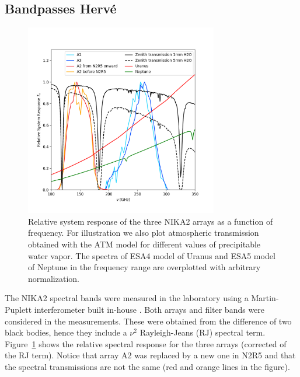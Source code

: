 


\subsection{Bandpasses {\color{YellowGreen} Herv\'e} }
\label{se:bandpasses}

\begin{figure}[ht!] %
\begin{center}
\includegraphics[clip,trim={0, 1cm, 0, 2cm},width=0.75\textwidth]{Figures/SpectralBands/bandpasses_nika2_colorsok.png}
\caption[NIKA2 transmission]{Relative system response of the three NIKA2 arrays as a
  function of frequency. For illustration we also plot atmospheric transmission obtained with the ATM model 
 \cite{ATM} for different values of precipitable water vapor. The spectra of ESA4 model of Uranus and ESA5 model of Neptune \cite{ESAmodel} in the frequency range are overplotted with arbitrary normalization.} 
 \label{spectralband1}
\end{center}
\end{figure}

 

The NIKA2 spectral bands were measured in the laboratory using a
Martin-Puplett interferometer built in-house \cite{durand}.  Both
arrays and filter bands were considered in the measurements. These
were obtained from the difference of two black bodies, hence they
include a $\nu^2$ Rayleigh-Jeans (RJ) spectral term.
Figure~\ref{spectralband1} shows the relative spectral response for
the three arrays (corrected of the RJ term).  Notice that array A2 was
replaced by a new one in N2R5 and that the spectral transmissions are
not the same (red and orange lines in the figure).

